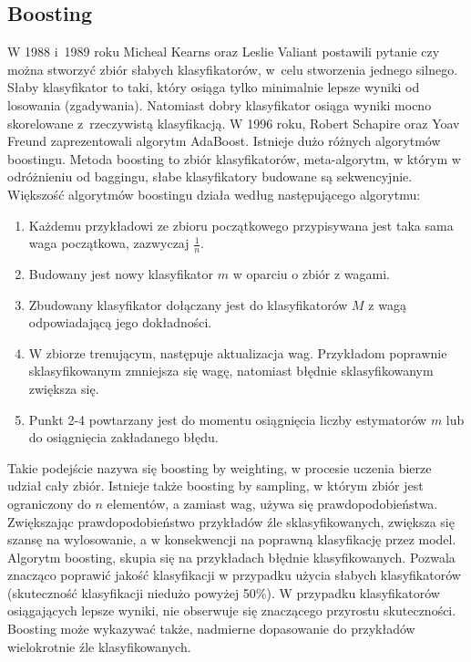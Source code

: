 \subsection{Boosting}
W 1988 i 1989 roku Micheal Kearns oraz Leslie Valiant postawili pytanie czy można stworzyć zbiór słabych klasyfikatorów, w celu stworzenia jednego silnego. Słaby klasyfikator to taki, który osiąga tylko minimalnie lepsze wyniki od losowania (zgadywania). Natomiast dobry klasyfikator osiąga wyniki mocno skorelowane z rzeczywistą klasyfikacją. W 1996 roku, Robert Schapire oraz Yoav Freund zaprezentowali algorytm AdaBoost. Istnieje dużo różnych algorytmów boostingu. 
Metoda boosting to zbiór klasyfikatorów, meta-algorytm, w którym w odróżnieniu od baggingu, słabe klasyfikatory budowane są sekwencyjnie. Większość algorytmów boostingu działa według następującego algorytmu:
\begin{enumerate}
	\item Każdemu przykładowi ze zbioru początkowego przypisywana jest taka sama waga początkowa, zazwyczaj $\frac{1}{n}$.
	\item Budowany jest nowy klasyfikator $m$ w oparciu o zbiór z wagami.
	\item Zbudowany klasyfikator dołączany jest do klasyfikatorów $M$ z wagą odpowiadającą jego dokładności.
	\item W zbiorze trenującym, następuje aktualizacja wag. Przykładom poprawnie sklasyfikowanym zmniejsza się wagę, natomiast  błędnie sklasyfikowanym zwiększa się.
	\item Punkt 2-4 powtarzany jest do momentu osiągnięcia liczby estymatorów $m$ lub do osiągnięcia zakładanego błędu. 
\end{enumerate}
Takie podejście nazywa się boosting by weighting, w procesie uczenia bierze udział cały zbiór. Istnieje także boosting by sampling, w którym zbiór jest ograniczony do $n$ elementów, a zamiast wag, używa się prawdopodobieństwa. Zwiększając prawdopodobieństwo przykładów źle sklasyfikowanych, zwiększa się szansę na wylosowanie, a w konsekwencji na poprawną klasyfikację przez model. \\
Algorytm boosting, skupia się na przykładach błędnie klasyfikowanych. Pozwala znacząco poprawić jakość klasyfikacji w przypadku użycia słabych klasyfikatorów (skuteczność klasyfikacji niedużo powyżej 50\%). W przypadku klasyfikatorów osiągających lepsze wyniki, nie obserwuje się znaczącego przyrostu skuteczności. Boosting może wykazywać także, nadmierne dopasowanie do przykładów wielokrotnie źle klasyfikowanych. \\

